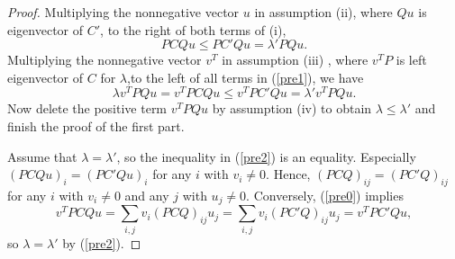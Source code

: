 \documentclass[12pt]{report}%
\theoremstyle{plain}
\theoremstyle{definition}
\begin{document}
\begin{proof}
            Multiplying the nonnegative vector $u$ in assumption (ii), where $Qu$ is eigenvector of $C'$,  to the right of both terms of  (i),
        \begin{equation}
            \label{pre1}
            PCQu\leq PC'Qu=\lambda'PQu.
        \end{equation}
        Multiplying the nonnegative vector $v^T$  in assumption (iii) , where $v^TP$ is left eigenvector of $C$ for $\lambda$,to the left of all terms  in (\ref{pre1}), we have
        \begin{equation}
            \label{pre2}
            \lambda v^TPQu=v^TPCQu\leq v^TPC'Qu=\lambda' v^TPQu.
        \end{equation}
        Now delete the positive term $v^TPQu$ by assumption (iv) to obtain $\lambda\leq \lambda'$ and finish the proof of the first part.



        Assume that $\lambda=\lambda'$, so the inequality in (\ref{pre2}) is an equality.  Especially $(PCQu)_i=(PC'Qu)_i$ for any $i$ with $v_i\not=0.$ Hence, $(PCQ)_{ij}=(PC'Q)_{ij}$ for any $i$ with $v_i\not=0$ and any $j$ with $u_j\not=0.$
         Conversely, (\ref{pre0}) implies $$v^TPCQu=\sum_{i,j} v_i(PCQ)_{ij}u_j=\sum_{i,j} v_i(PC'Q)_{ij}u_j=v^TPC'Qu,$$ so
            $\lambda=\lambda'$ by (\ref{pre2}).

 \end{proof}
\end{document}
